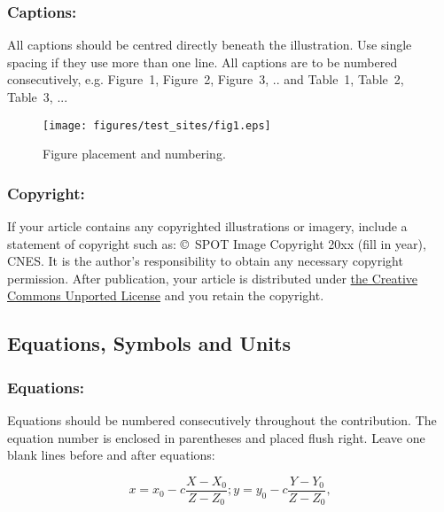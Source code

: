 \documentclass{isprs} %
\begin{document}
\subsubsection{Captions:}\label{sec:Captions}

All captions should be centred directly beneath the illustration. Use single spacing if they 
use more than one line. All captions are to be numbered consecutively, 
e.g. Figure~1, Figure~2, Figure~3, ..  and Table~1, Table~2, Table~3, ...

\begin{figure}[ht!]
\begin{center}
		\texttt{[image: figures/test\_sites/fig1.eps]}
	\caption{Figure placement and numbering.}
\label{fig:figure_placement}
\end{center}
\end{figure}


\subsubsection{Copyright:}\label{sec:Copyright}

If your article contains any copyrighted illustrations or imagery, 
include a statement of copyright such as: \copyright~SPOT Image Copyright 20xx 
(fill in year), CNES\@. It is the author's responsibility to obtain any necessary 
copyright permission. After publication, your article is distributed under \underline{the Creative 
Commons Unported License} and you retain the copyright.


\subsection{Equations, Symbols and Units}\label{sec:Equations, Symbols and Units}

\subsubsection{Equations:}\label{sec:Equations}

Equations should be numbered consecutively throughout the contribution. The equation 
number is enclosed in parentheses and placed flush right. Leave one blank lines 
before and after equations: 


\begin{equation}\label{equ:1}
	x = x_0 -c \frac{X - X_0}{Z - Z_0}; y = y_0 -c \frac{Y - Y_0}{Z - Z_0},
\end{equation}
\end{document}
